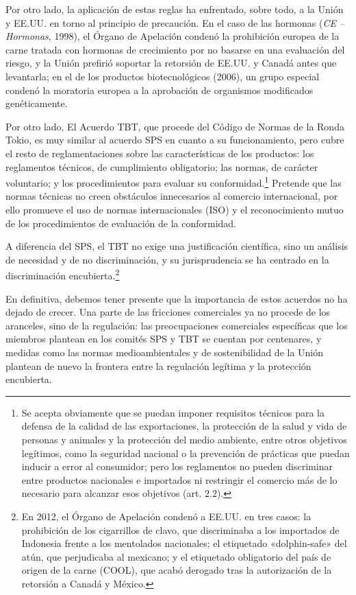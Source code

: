 \documentclass[10pt,a4paper]{article}
\begin{document}
{  Por otro lado, la aplicación de estas reglas ha enfrentado, sobre todo, a la Unión y EE.UU. en torno al principio de precaución. En el caso de las hormonas (\textit{CE -- Hormonas}, 1998), el Órgano de Apelación condenó la prohibición europea de la carne tratada con hormonas de crecimiento por no basarse en una evaluación del riesgo, y la Unión prefirió soportar la retorsión de EE.UU. y Canadá antes que levantarla; en el de los productos biotecnológicos (2006), un grupo especial condenó la moratoria europea a la aprobación de organismos modificados genéticamente.
}

Por otro lado, El Acuerdo TBT, que procede del Código de Normas de la Ronda Tokio, es muy similar al acuerdo SPS en cuanto a su funcionamiento, pero cubre el resto de reglamentaciones sobre las características de los productos: los reglamentos técnicos, de cumplimiento obligatorio; las normas, de carácter voluntario; y los procedimientos para evaluar su conformidad.\footnote{%
  Se acepta obviamente que se puedan imponer requisitos técnicos para la defensa de la calidad de las exportaciones, la protección de la salud y vida de personas y animales y la protección del medio ambiente, entre otros objetivos legítimos, como la seguridad nacional o la prevención de prácticas que puedan inducir a error al consumidor; pero los reglamentos no pueden discriminar entre productos nacionales e importados ni restringir el comercio más de lo necesario para alcanzar esos objetivos (art. $2.2$).
} Pretende que las normas técnicas no creen obstáculos innecesarios al comercio internacional, por ello promueve el uso de normas internacionales (ISO) y el reconocimiento mutuo de los procedimientos de evaluación de la conformidad.

A diferencia del SPS, el TBT no exige una justificación científica, sino un análisis de necesidad y de no discriminación, y su jurisprudencia se ha centrado en la discriminación encubierta.\footnote{%
  En 2012, el Órgano de Apelación condenó a EE.UU. en tres casos: la prohibición de los cigarrillos de clavo, que discriminaba a los importados de Indonesia frente a los mentolados nacionales; el etiquetado «dolphin-safe» del atún, que perjudicaba al mexicano; y el etiquetado obligatorio del país de origen de la carne (COOL), que acabó derogado tras la autorización de la retorsión a Canadá y México.
}

En definitiva, debemos tener presente que la importancia de estos acuerdos no ha dejado de crecer. Una parte de las fricciones comerciales ya no procede de los aranceles, sino de la regulación: las preocupaciones comerciales específicas que los miembros plantean en los comités SPS y TBT se cuentan por centenares, y medidas como las normas medioambientales y de sostenibilidad de la Unión plantean de nuevo la frontera entre la regulación legítima y la protección encubierta. 
\end{document}
